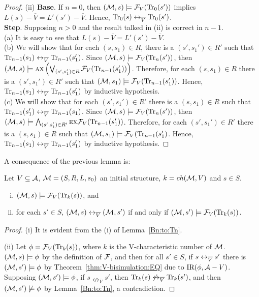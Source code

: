 \documentclass{article}
\begin{document}
\begin{proof}
 (ii)  \textbf{Base}. If $n=0$, then $({\cal M}, s)  \models {\cal F}_V(\textrm{Tr}_0(s'))$ implies $L(s) - \overline V = L'(s') - \overline V$. Hence, $\textrm{Tr}_0(s) \leftrightarrow_{\overline V} \textrm{Tr}_0(s')$.\\
     \textbf{Step}. Supposing $n>0$ and the result talked in (ii) is correct in $n-1$.\\
   (a) It is easy to see that $L(s) - \overline V = L'(s') - \overline V$.\\
   (b) We will show that for each $(s, s_1) \in R$, there is a $(s', s_1') \in R'$ such that $\textrm{Tr}_{n-1}(s_1) \leftrightarrow_{\overline V} \textrm{Tr}_{n-1}(s_1')$.
       Since $({\cal M}, s) \models {\cal F}_V(\textrm{Tr}_n(s'))$, then $({\cal M}, s) \models \textsc{a} \textsc{x}\left(\bigvee_{(s',s_1')\in R}{\cal F}_V(\textrm{Tr}_{n-1}(s_1') )\right)$.
       Therefore, for each $(s, s_1) \in R$ there is a $(s', s_1') \in R'$ such that $({\cal M}, s_1) \models {\cal F}_V(\textrm{Tr}_{n-1}(s_1') )$. Hence, $\textrm{Tr}_{n-1}(s_1) \leftrightarrow_{\overline V} \textrm{Tr}_{n-1}(s_1')$ by inductive hypothesis.\\
   (c) We will show that for each $(s',s_1')\in R'$ there is a $(s,s_1)\in R$ such that $\textrm{Tr}_{n-1}(s_1') \leftrightarrow_{\overline V} \textrm{Tr}_{n-1}(s_1)$.
       Since $({\cal M}, s) \models {\cal F}_V(\textrm{Tr}_n(s'))$, then $({\cal M}, s) \models  \bigwedge_{(s',s_1')\in R'} \textsc{e} \textsc{x} {\cal F}_V(\textrm{Tr}_{n-1}(s_1'))$.
       Therefore, for each $(s',s_1')\in R'$ there is a $(s,s_1)\in R$ such that $({\cal M}, s_1) \models {\cal F}_V(\textrm{Tr}_{n-1}(s_1')$.
       Hence, $\textrm{Tr}_{n-1}(s_1) \leftrightarrow_{\overline V} \textrm{Tr}_{n-1}(s_1')$ by inductive hypothesis.
 \end{proof}


 A consequence of the previous lemma is:

 \begin{lemma}\label{div_s}
 Let $V\subseteq {\cal A}$, ${\cal M}=(S,R,L,s_0)$ an initial structure, $k={ch({\cal M},V)}$ and $s\in S$.
 \begin{enumerate}[(i)]
   \item $({\cal M}, s)\models {\cal F}_V(\textrm{Tr}_k(s))$, and
   \item for each $s'\in S$, $({\cal M},s) \leftrightarrow_{\overline V} ({\cal M},s')$
   if and only if $({\cal M},s')\models{\cal F}_V(\textrm{Tr}_k(s))$.
 \end{enumerate}
 \end{lemma}
 \begin{proof}
 (i) It is evident from the (i) of Lemma~\ref{Bn:to:Tn}.

 (ii) Let $\phi = {\cal F}_V(\textrm{Tr}_k(s))$, where $k$ is the V-characteristic number of ${\cal M}$. $({\cal M}, s) \models \phi$ by the definition of ${\cal F}$, and then for all $s' \in S$, if $s \leftrightarrow_{\overline V} s'$ there is $({\cal M}, s') \models \phi$ by Theorem~\ref{thm:V-bisimulation:EQ} due to $\textrm{IR}(\phi, {\cal A} - V)$. Supposing $({\cal M}, s')\models \phi$, if $s \nleftrightarrow_{\overline V} s'$, then $\textrm{Tr}_k(s) \not \leftrightarrow_{\overline V} \textrm{Tr}_k(s')$, and then $({\cal M}, s')\not \models \phi$ by Lemma~\ref{Bn:to:Tn}, a contradiction.
 \end{proof}
\end{document}
